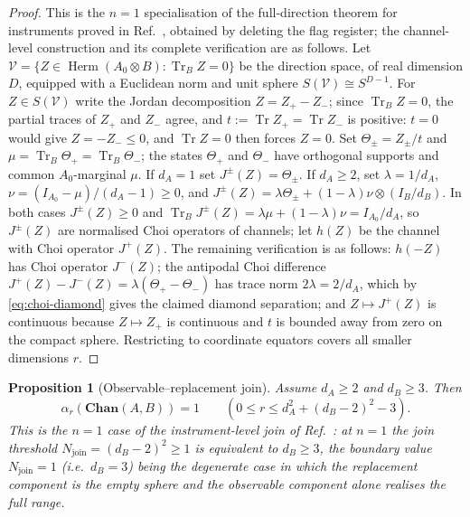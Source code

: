 \documentclass[11pt,a4paper]{article}
\theoremstyle{definition}
\theoremstyle{plain}
\newtheorem{proposition}[theorem]{Proposition}
\theoremstyle{remark}
\DeclareMathOperator{\Tr}{Tr}
\DeclareMathOperator{\Herm}{Herm}
\newcommand{\Chan}{\mathbf{Chan}}
\begin{document}
\begin{proof}
This is the $n=1$ specialisation of the full-direction theorem for instruments proved in Ref.~\cite{CompanionInstruments}, obtained by deleting the flag register; the channel-level construction and its complete verification are as follows. Let $\mathcal V=\{Z\in\Herm(A_0\otimes B):\Tr_BZ=0\}$ be the direction space, of real dimension $D$, equipped with a Euclidean norm and unit sphere $S(\mathcal V)\cong S^{D-1}$. For $Z\in S(\mathcal V)$ write the Jordan decomposition $Z=Z_+-Z_-$; since $\Tr_BZ=0$, the partial traces of $Z_+$ and $Z_-$ agree, and $t:=\Tr Z_+=\Tr Z_-$ is positive: $t=0$ would give $Z=-Z_-\le0$, and $\Tr Z=0$ then forces $Z=0$. Set $\Theta_\pm=Z_\pm/t$ and $\mu=\Tr_B\Theta_+=\Tr_B\Theta_-$; the states $\Theta_+$ and $\Theta_-$ have orthogonal supports and common $A_0$-marginal $\mu$. If $d_A=1$ set $J^\pm(Z)=\Theta_\pm$. If $d_A\ge2$, set $\lambda=1/d_A$, $\nu=(I_{A_0}-\mu)/(d_A-1)\ge0$, and $J^\pm(Z)=\lambda\Theta_\pm+(1-\lambda)\nu\otimes(I_B/d_B)$. In both cases $J^\pm(Z)\ge0$ and $\Tr_BJ^\pm(Z)=\lambda\mu+(1-\lambda)\nu=I_{A_0}/d_A$, so $J^\pm(Z)$ are normalised Choi operators of channels; let $h(Z)$ be the channel with Choi operator $J^+(Z)$. The remaining verification is as follows: $h(-Z)$ has Choi operator $J^-(Z)$; the antipodal Choi difference $J^+(Z)-J^-(Z)=\lambda(\Theta_+-\Theta_-)$ has trace norm $2\lambda=2/d_A$, which by \eqref{eq:choi-diamond} gives the claimed diamond separation; and $Z\mapsto J^+(Z)$ is continuous because $Z\mapsto Z_+$ is continuous and $t$ is bounded away from zero on the compact sphere. Restricting to coordinate equators covers all smaller dimensions $r$.
\end{proof}

\begin{proposition}[Observable--replacement join]
\label{prop:join-channel}
Assume $d_A\ge2$ and $d_B\ge3$. Then
\[
\alpha_r(\Chan(A,B))=1
\qquad(0\le r\le d_A^2+(d_B-2)^2-3).
\]
This is the $n=1$ case of the instrument-level join of
Ref.~\cite{CompanionInstruments}: at $n=1$ the join threshold
$N_{\mathrm{join}}=(d_B-2)^2\ge1$ is equivalent to $d_B\ge3$, the boundary
value $N_{\mathrm{join}}=1$ (i.e.\ $d_B=3$) being the degenerate case in which
the replacement component is the empty sphere and the observable component
alone realises the full range.
\end{proposition}
\end{document}
